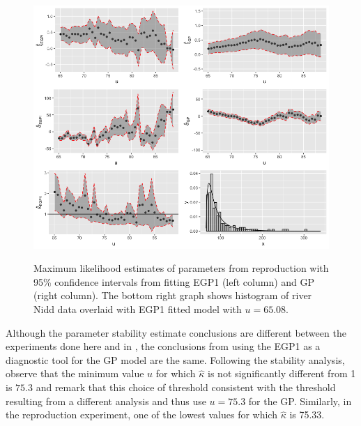 \documentclass[12pt]{article}
\theoremstyle{definition}
\theoremstyle{definition}
\begin{document}
\begin{figure}[H]
\begin{center}
{\includegraphics[width=5.0in]{project/papafiles/fig5.me.png}}
\caption{Maximum likelihood estimates of parameters from reproduction with 95\% confidence intervals from fitting EGP1 (left column) and GP (right column). The bottom right graph shows histogram of river Nidd data overlaid with EGP1 fitted model with $u=65.08$.}
\end{center}
\end{figure}

Although the parameter stability estimate conclusions are different between the experiments done here and in \cite{papatawn}, the conclusions from using the EGP1 as a diagnostic tool for the GP model are the same. Following the stability analysis, \cite{papatawn} observe that the minimum value $u$ for which $\hat\kappa$ is not significantly different from 1 is $75.3$ and remark that this choice of threshold consistent with the threshold resulting from a different analysis \cite{fig5} and thus use $u=75.3$ for the GP. Similarly, in the reproduction experiment, one of the lowest values for which $\hat\kappa$ is 75.33. 
\end{document}
